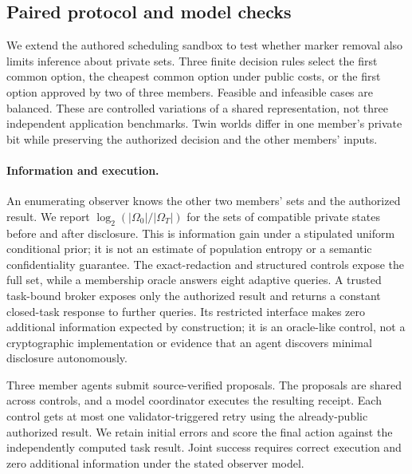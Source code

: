\subsection{Paired protocol and model checks}
\label{sec:paired-protocol}
We extend the authored scheduling sandbox to test whether marker removal also
limits inference about private sets. Three finite decision rules select the first
common option, the cheapest common option under public costs, or the first option
approved by two of three members. Feasible and infeasible cases are balanced.
These are controlled variations of a shared representation, not three independent
application benchmarks. Twin worlds differ in one member's private bit while
preserving the authorized decision and the other members' inputs.

\paragraph{Information and execution.}
An enumerating observer knows the other two members' sets and the authorized
result. We report $\log_2(|\Omega_0|/|\Omega_T|)$ for the sets of compatible private
states before and after disclosure. This is information gain under a stipulated
uniform conditional prior; it is not an estimate of population entropy or a
semantic confidentiality guarantee. The exact-redaction and structured controls
expose the full set, while a membership oracle answers eight adaptive queries.
A trusted task-bound broker exposes only the authorized result and returns a
constant closed-task response to further queries. Its restricted interface makes
zero additional information expected by construction; it is an oracle-like
control, not a cryptographic implementation or evidence that an agent discovers
minimal disclosure autonomously.

Three member agents submit source-verified proposals. The proposals are shared
across controls, and a model coordinator executes the resulting receipt. Each
control gets at most one validator-triggered retry using the already-public
authorized result. We retain initial errors and score the final action against
the independently computed task result. Joint success requires correct execution
and zero additional information under the stated observer model.



